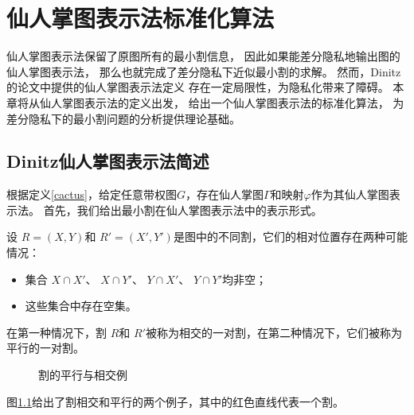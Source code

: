 \chapter{仙人掌图表示法标准化算法}

仙人掌图表示法保留了原图所有的最小割信息，
因此如果能差分隐私地输出图的仙人掌图表示法，
那么也就完成了差分隐私下近似最小割的求解。
然而，Dinitz的论文\cite{dinitz1976structure}中提供的仙人掌图表示法定义
存在一定局限性，为隐私化带来了障碍。
本章将从仙人掌图表示法的定义出发，
给出一个仙人掌图表示法的标准化算法，
为差分隐私下的最小割问题的分析提供理论基础。

\section{Dinitz仙人掌图表示法简述}

根据定义\ref{cactus}，给定任意带权图$G$，存在仙人掌图$\Gamma$和映射$\varphi$作为其仙人掌图表示法。
首先，我们给出最小割在仙人掌图表示法中的表示形式。

\begin{definition}[割的平行与相交]
  设 $R = (X, Y)$和 $R' = (X', Y')$是图中的不同割，它们的相对位置存在两种可能情况：
  \begin{itemize}
    \item 集合 $X \cap X'$、 $X \cap Y'$、 $Y \cap X'$、 $Y \cap Y'$均非空；
    \item 这些集合中存在空集。
  \end{itemize}
  在第一种情况下，割 $R$和 $R'$被称为相交的一对割，在第二种情况下，它们被称为平行的一对割。
\end{definition}
\begin{figure}[htb]
  \centering
  \hspace{4em}
  \caption{割的平行与相交例}
  \label{crosscut}
\end{figure}
图\ref{crosscut}给出了割相交和平行的两个例子，其中的红色直线代表一个割。

